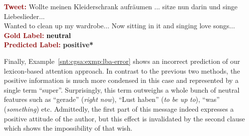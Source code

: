 \begin{example}\label{snt:cgsa:exmp:baziotis-error}
  \noindent\textup{\bfseries\textcolor{darkred}{Tweet:}} {\upshape \colorbox{white!1.4}{Wollte} \colorbox{blue!7.7}{meinen} \colorbox{white!3.6}{Kleiderschrank} \colorbox{blue!1.7}{aufr\"aumen} ... \colorbox{white!1.2}{sitze} \colorbox{green!4.6}{nun} \colorbox{green!31.5}{darin} \colorbox{green!2.8}{und} \colorbox{green!29.7}{singe} \colorbox{green!15.2}{Liebeslieder}...}\\
  \noindent \colorbox{white!1.4}{Wanted} to \colorbox{blue!1.7}{clean up} \colorbox{blue!7.7}{my} \colorbox{white!3.6}{wardrobe}... \colorbox{green!4.6}{Now} \colorbox{white!1.2}{sitting} \colorbox{green!31.5}{in it} \colorbox{green!2.8}{and} \colorbox{green!29.7}{singing} \colorbox{green!15.2}{love songs}...\\[\exampleSep]
  \noindent\textup{\bfseries\textcolor{darkred}{Gold Label:}}\hspace*{4.3em}\textbf{%
    \upshape\textcolor{black}{neutral}}\\
 \noindent\textup{\bfseries\textcolor{darkred}{Predicted Label:}}\hspace*{2em}\textbf{%
    \upshape\textcolor{green3}{positive*}}
\end{example}

Finally, Example~\ref{snt:cgsa:exmp:lba-error} shows an incorrect
prediction of our lexicon-based attention approach.  In contrast to
the previous two methods, the positive information is much more
condensed in this case and represented by a single term ``super''.
Surprisingly, this term outweighs a whole bunch of neutral features
such as ``gerade'' (\emph{right now}), ``Lust haben'' (\emph{to be up
  to}), ``was'' (\emph{something}) etc.  Admittedly, the first part of
this message indeed expresses a positive attitude of the author, but
this effect is invalidated by the second clause which shows the
impossibility of that wish.

